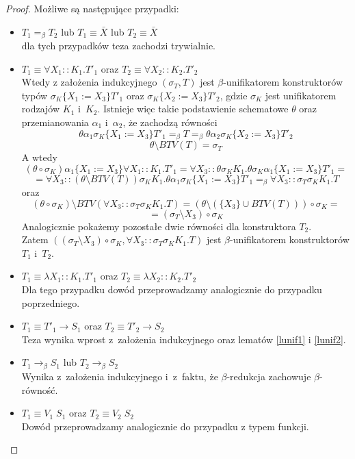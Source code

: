 \documentclass[11pt,leqno]{article}
\begin{document}
\begin{proof}
Możliwe są następujące przypadki:
\begin{itemize}
\item $T_1 =_\beta T_2$ lub $T_1 \equiv \bar{X}$ lub $T_2 \equiv \bar{X}$ \\
dla tych przypadków teza zachodzi trywialnie.
\item $T_1 \equiv \forall X_1::K_1.T'_1$ oraz $T_2 \equiv \forall X_2::K_2.T'_2$ \\
Wtedy z założenia indukcyjnego $(\sigma_T, T)$ jest $\beta$-unifikatorem konstruktorów typów
$\sigma_K \{X_1:=X_3\}T'_1$ oraz $\sigma_K\{X_2:=X_3\}T'_2$, gdzie $\sigma_K$ jest unifikatorem rodzajów $K_1$ i~$K_2$.
Istnieje więc takie podstawienie schematowe $\theta$ oraz przemianowania $\alpha_1$ i~$\alpha_2$, że zachodzą równości
\[
\theta \alpha_1 \sigma_K \{X_1:=X_3\}T'_1 =_\beta T =_\beta \theta \alpha_2 \sigma_K \{X_2:=X_3\} T'_2
\]
\[
\theta \setminus BTV(T) = \sigma_T
\]
A wtedy
\[
(\theta \circ \sigma_K)\alpha_1\{X_1:=X_3\} \forall X_1::K_1.T'_1 = \forall X_3::\theta\sigma_K K_1. \theta\sigma_K\alpha_1 \{X_1 := X_3\} T'_1 =
\]
\[
= \forall X_3::(\theta \setminus BTV(T))\sigma_K K_1.\theta \alpha_1 \sigma_K \{X_1 := X_3\}T'_1 =_\beta \forall X_3::\sigma_T\sigma_K K_1.T
\]
oraz
\[
(\theta \circ \sigma_K) \setminus BTV(\forall X_3::\sigma_T\sigma_K K_1.T) = (\theta \setminus (\{X_3\} \cup BTV(T))) \circ \sigma_K =
\]
\[
= (\sigma_T \setminus X_3) \circ \sigma_K
\]
Analogicznie pokażemy pozostałe dwie równości dla konstruktora $T_2$.\\ Zatem 
\mbox{$((\sigma_T \setminus X_3) \circ \sigma_K, \forall X_3::\sigma_T \sigma_K K_1.T)$} jest $\beta$-unifikatorem konstruktorów $T_1$ i~$T_2$.
\item $T_1 \equiv \lambda X_1::K_1.T'_1$ oraz $T_2 \equiv \lambda X_2::K_2.T'_2$ \\
Dla tego przypadku dowód przeprowadzamy analogicznie do przypadku poprzedniego.
\item $T_1 \equiv T'_1 \rightarrow S_1$ oraz $T_2 \equiv T'_2 \rightarrow S_2$ \\
Teza wynika wprost z~założenia indukcyjnego oraz lematów \ref{lunif1} i \ref{lunif2}.
\item $T_1 \longrightarrow_\beta S_1$ lub $T_2 \longrightarrow_\beta S_2$ \\
Wynika z~założenia indukcyjnego i~z~faktu, że $\beta$-redukcja zachowuje $\beta$-równość.
\item $T_1 \equiv V_1\;S_1$ oraz $T_2 \equiv V_2\;S_2$ \\
Dowód przeprowadzamy analogicznie do przypadku z typem funkcji.
\end{itemize}
\end{proof}
\end{document}
